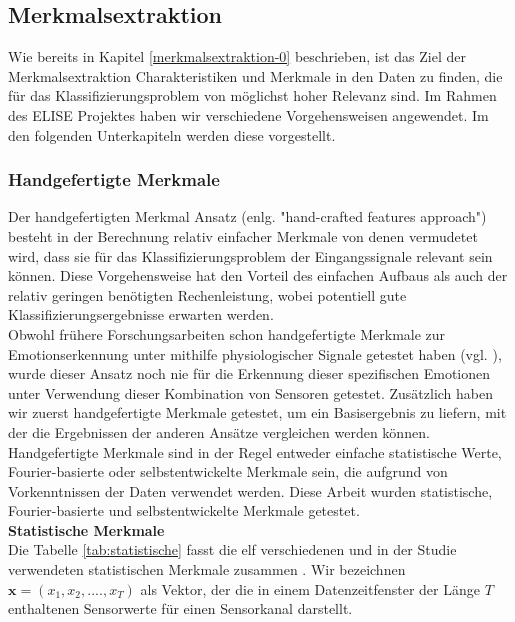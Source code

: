\subsection{Merkmalsextraktion} \label{merkmalsextraftion-1}

Wie bereits in Kapitel \ref{merkmalsextraktion-0} beschrieben, ist das Ziel der Merkmalsextraktion Charakteristiken und Merkmale in den Daten zu finden, die für das
Klassifizierungsproblem von möglichst hoher Relevanz sind. Im Rahmen des ELISE Projektes haben wir verschiedene Vorgehensweisen angewendet. Im den folgenden Unterkapiteln werden diese vorgestellt. \\



\subsubsection{Handgefertigte Merkmale} \label{hc-features-1}
Der handgefertigten Merkmal Ansatz (enlg. "hand-crafted features approach") besteht in der Berechnung relativ einfacher Merkmale von denen vermudetet wird, dass sie für das Klassifizierungsproblem der Eingangssignale relevant sein können. Diese Vorgehensweise hat den Vorteil des einfachen Aufbaus als auch der relativ geringen benötigten Rechenleistung, wobei potentiell gute Klassifizierungsergebnisse erwarten werden. \\


Obwohl frühere Forschungsarbeiten schon handgefertigte Merkmale zur Emotionserkennung unter mithilfe physiologischer Signale getestet haben (vgl. \cite{martinez_ieee_2013}), wurde dieser Ansatz noch nie für die Erkennung dieser spezifischen Emotionen unter Verwendung dieser Kombination von Sensoren getestet.
Zusätzlich haben wir zuerst handgefertigte Merkmale getestet, um ein Basisergebnis zu liefern, mit der die Ergebnissen der anderen Ansätze vergleichen werden können.
Handgefertigte Merkmale sind in der Regel entweder einfache statistische Werte, Fourier-basierte oder selbstentwickelte Merkmale sein, die aufgrund von Vorkenntnissen der Daten verwendet werden. 
Diese Arbeit wurden statistische, Fourier-basierte und selbstentwickelte Merkmale getestet. \\

\textbf{Statistische Merkmale \\}
Die Tabelle \ref{tab:statistische} fasst die elf verschiedenen und in der Studie verwendeten statistischen Merkmale zusammen \cite{bscpiet}. Wir bezeichnen $\mathbf{x} = (x_1, x_2, ...., x_T) $ als Vektor, der die in einem Datenzeitfenster der Länge $T$ enthaltenen Sensorwerte für einen Sensorkanal darstellt. 


